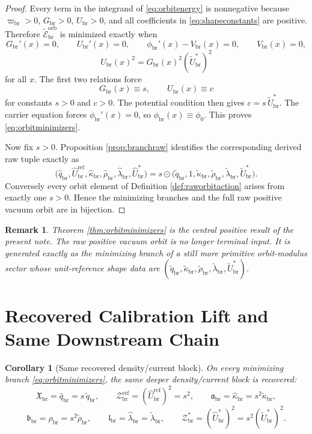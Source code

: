 \documentclass[11pt]{article}
\newcommand{\ProfWeight}{\varpi_{\mathrm{br}}}
\newcommand{\RespDeepReadout}{\mathfrak X_{\mathrm{br}}}
\newcommand{\RespDeepDensityRef}{\mathcal Z_{\mathrm{br}}^{\mathrm{ref}}}
\newcommand{\RespDeepTrack}{\mathfrak a_{\mathrm{br}}}
\newcommand{\RespDeepRelax}{\mathfrak b_{\mathrm{br}}}
\newcommand{\RespDeepWell}{\mathfrak l_{\mathrm{br}}}
\newcommand{\RespDeepDensityEq}{\mathcal Z_{\mathrm{br}}^{\ast}}
\newcommand{\RespVacAmp}{U_{\mathrm{br}}}
\newcommand{\RespVacPhase}{\phi_{\mathrm{br}}}
\newcommand{\RespVacCarrier}{V_{\mathrm{br}}}
\newcommand{\RespRawReadout}{\widehat q_{\mathrm{br}}}
\newcommand{\RespRawRef}{\widehat U_{\mathrm{br}}^{\mathrm{ref}}}
\newcommand{\RespRawCov}{\widehat\kappa_{\mathrm{br}}}
\newcommand{\RespRawRelax}{\widehat\rho_{\mathrm{br}}}
\newcommand{\RespRawWell}{\widehat\lambda_{\mathrm{br}}}
\newcommand{\RespRawEq}{\widehat U_{\mathrm{br}}^{\ast}}
\newcommand{\RespShapeReadout}{\widetilde q_{\mathrm{br}}}
\newcommand{\RespShapeCov}{\widetilde\kappa_{\mathrm{br}}}
\newcommand{\RespShapeRelax}{\widetilde\rho_{\mathrm{br}}}
\newcommand{\RespShapeWell}{\widetilde\lambda_{\mathrm{br}}}
\newcommand{\RespShapeEq}{\widetilde U_{\mathrm{br}}^{\ast}}
\newcommand{\RespOrbitField}{G_{\mathrm{br}}}
\newcommand{\RespOrbitEnergy}{\widetilde{\mathscr E}_{\mathrm{br}}^{\mathrm{orb}}}
\newtheorem{remark}{Remark}
\newtheorem{corollary}{Corollary}
\begin{document}
\begin{proof}
Every term in the integrand of \eqref{eq:orbitenergy} is nonnegative because \(\ProfWeight>0\), \(\RespOrbitField>0\), \(\RespVacAmp>0\), and all coefficients in \eqref{eq:shapeconstants} are positive. Therefore \(\RespOrbitEnergy\) is minimized exactly when
\[
\RespOrbitField'(x)=0,
\qquad
\RespVacAmp'(x)=0,
\qquad
\RespVacPhase'(x)-\RespVacCarrier(x)=0,
\qquad
\RespVacCarrier(x)=0,
\]
\[
\RespVacAmp(x)^2=\RespOrbitField(x)^2(\RespShapeEq)^2
\]
for all \(x\). The first two relations force
\[
\RespOrbitField(x)\equiv s,
\qquad
\RespVacAmp(x)\equiv c
\]
for constants \(s>0\) and \(c>0\). The potential condition then gives \(c=s\,\RespShapeEq\). The carrier equation forces \(\RespVacPhase'(x)=0\), so \(\RespVacPhase(x)\equiv\phi_0\). This proves \eqref{eq:orbitminimizers}.

Now fix \(s>0\). Proposition \ref{prop:branchraw} identifies the corresponding derived raw tuple exactly as
\[
\bigl(\RespRawReadout,\RespRawRef,\RespRawCov,\RespRawRelax,\RespRawWell,\RespRawEq\bigr)
=
s\odot\bigl(\RespShapeReadout,1,\RespShapeCov,\RespShapeRelax,\RespShapeWell,\RespShapeEq\bigr).
\]
Conversely every orbit element of Definition \ref{def:raworbitaction} arises from exactly one \(s>0\). Hence the minimizing branches and the full raw positive vacuum orbit are in bijection.
\end{proof}

\begin{remark}
Theorem \ref{thm:orbitminimizers} is the central positive result of the present note. The raw positive vacuum orbit is no longer terminal input. It is generated exactly as the minimizing branch of a still more primitive orbit-modulus sector whose unit-reference shape data are \((\RespShapeReadout,\RespShapeCov,\RespShapeRelax,\RespShapeWell,\RespShapeEq)\).
\end{remark}

\section{Recovered Calibration Lift and Same Downstream Chain}

\begin{corollary}[Same recovered density/current block]
\label{cor:samedeepblock}
On every minimizing branch \eqref{eq:orbitminimizers}, the same deeper density/current block is recovered:
\begin{equation}
\RespDeepReadout=\RespRawReadout=s\,\RespShapeReadout,
\qquad
\RespDeepDensityRef=(\RespRawRef)^2=s^2,
\qquad
\RespDeepTrack=\RespRawCov=s^2\RespShapeCov,
\label{eq:deepfromshapeA}
\end{equation}
\begin{equation}
\RespDeepRelax=\RespRawRelax=s^2\RespShapeRelax,
\qquad
\RespDeepWell=\RespRawWell=\RespShapeWell,
\qquad
\RespDeepDensityEq=(\RespRawEq)^2=s^2(\RespShapeEq)^2.
\label{eq:deepfromshapeB}
\end{equation}
\end{corollary}
\end{document}
